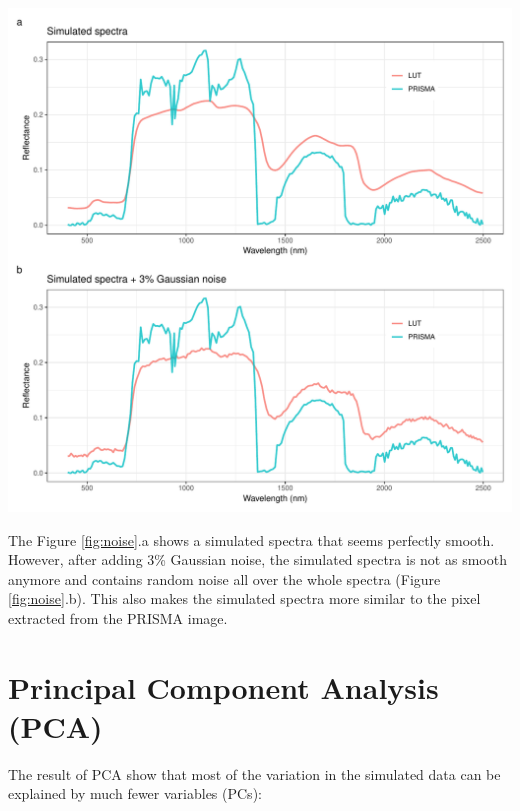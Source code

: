 \documentclass[a4paper, twoside]{templates/ociamthesis}
\let\origfigure\figure
\let\endorigfigure\endfigure
\renewenvironment{figure}[1][2] {
    \expandafter\origfigure\expandafter[H]
} {
    \endorigfigure
}
\begin{document}
\begin{figure}
\includegraphics[width=0.9\linewidth]{./figures/noise} \caption{Effect of adding $3\%$ Gaussian noise to the simulated spectra. The randomly chosen pixel from the PRISMA data was plotted to illustrate the noise typically found in the image}\label{fig:noise}
\end{figure}

The Figure \ref{fig:noise}.a shows a simulated spectra that seems perfectly smooth. However, after adding 3\% Gaussian noise, the simulated spectra is not as smooth anymore and contains random noise all over the whole spectra (Figure \ref{fig:noise}.b). This also makes the simulated spectra more similar to the pixel extracted from the PRISMA image.

\hypertarget{principal-component-analysis-pca-1}{%
\section{Principal Component Analysis (PCA)}\label{principal-component-analysis-pca-1}}

The result of PCA show that most of the variation in the simulated data can be explained by much fewer variables (PCs):
\end{document}
